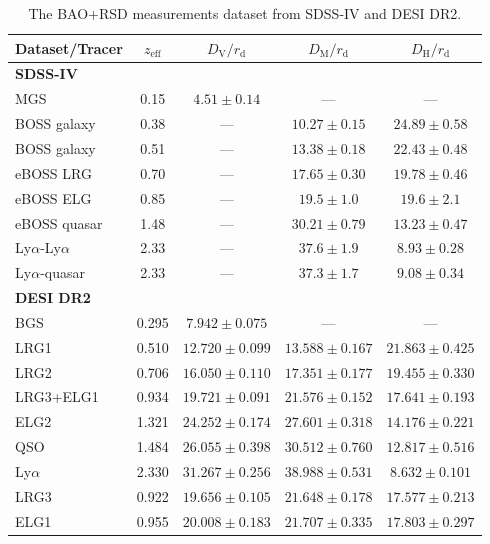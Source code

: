 \documentclass[twocolumn]{aastex631}
\begin{document}
   \begin{table}
      \centering
      \begin{tabular}{l|cccc}
         \hline\hline
         Dataset/Tracer & $z_{\text{eff}}$ & $D_{\text{V}}/r_{\text{d}}$ & 
         $D_{\text{M}}/r_{\text{d}}$ & $D_{\text{H}}/r_{\text{d}}$ \\
         \hline
         \textbf{SDSS-IV} \\
         MGS & 0.15 & $4.51 \pm 0.14$ & --- & --- \\
         BOSS galaxy & 0.38 & --- & $10.27 \pm 0.15$ & $24.89 \pm 0.58$ \\
         BOSS galaxy & 0.51 & --- & $13.38 \pm 0.18$ & $22.43 \pm 0.48$ \\
         eBOSS LRG & 0.70 & --- & $17.65 \pm 0.30$ & $19.78 \pm 0.46$ \\
         eBOSS ELG & 0.85 & --- & $19.5 \pm 1.0$ & $19.6 \pm 2.1$ \\
         eBOSS quasar& 1.48 & --- & $30.21 \pm 0.79$ & $13.23 \pm 0.47$ \\
         Ly$\alpha$-Ly$\alpha$ & 2.33 & --- & $37.6 \pm 1.9$ & $8.93 \pm 0.28$ \\
         Ly$\alpha$-quasar & 2.33 & --- & $37.3 \pm 1.7$ & $9.08 \pm 0.34$ \\
         \hline\hline
         \textbf{DESI DR2} \\ 
         BGS & 0.295 & $7.942 \pm 0.075$  & --- & --- \\
         LRG1 & 0.510 & $12.720 \pm 0.099$ & $13.588 \pm 0.167$ & $21.863 \pm 0.425$ \\
         LRG2 & 0.706 & $16.050 \pm 0.110$ & $17.351 \pm 0.177$ & $19.455 \pm 0.330$ \\
         LRG3+ELG1 & 0.934 & $19.721 \pm 0.091$ & $21.576 \pm 0.152$ & $17.641 \pm 0.193$ \\
         ELG2 & 1.321 & $24.252 \pm 0.174$ & $27.601 \pm 0.318$ & $14.176 \pm 0.221$ \\
         QSO & 1.484 & $26.055 \pm 0.398$ & $30.512 \pm 0.760$ & $12.817 \pm 0.516$ \\
         Ly$\alpha$ & 2.330 & $31.267 \pm 0.256$ & $38.988 \pm 0.531$ & $8.632 \pm 0.101$ \\
         \hline
         LRG3 & 0.922 & $19.656 \pm 0.105$ & $21.648 \pm 0.178$ & $17.577 \pm 0.213$ \\
         ELG1 & 0.955 & $20.008 \pm 0.183$ & $21.707 \pm 0.335$ & $17.803 \pm 0.297$ \\    
         \hline\hline
      \end{tabular}
      \caption{The BAO+RSD measurements dataset from SDSS-IV and DESI DR2.}
      \label{tab:2}
   \end{table}
\end{document}
